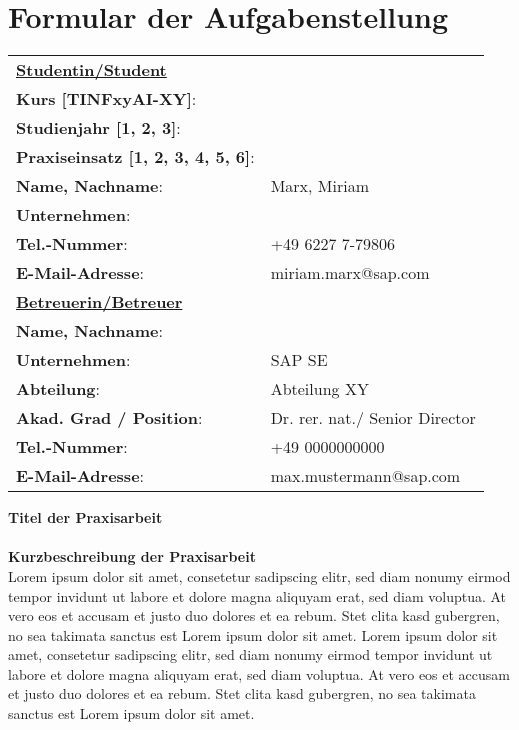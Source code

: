 \chapter*{Formular der Aufgabenstellung} %


\begin{spacing}{1.3}
\begin{tabular}{ll}
\underline{\textbf{Studentin/Student}}	& \\
\textbf{Kurs [TINFxyAI-XY]}: 			& \quad \kurs \\ 
\textbf{Studienjahr [1, 2, 3]}:			& \quad	3\\
\textbf{Praxiseinsatz [1, 2, 3, 4, 5, 6]}:	& \quad 5\\
\textbf{Name, Nachname}:				& \quad Marx, Miriam\\
\textbf{Unternehmen}:	 				& \quad \firma \\ 
\textbf{Tel.-Nummer}: 					& \quad  +49 6227 7-79806\\ 
\textbf{E-Mail-Adresse}: 				& \quad miriam.marx@sap.com  \\ [2ex]

\underline{\textbf{Betreuerin/Betreuer}}	& \\
\textbf{Name, Nachname}: 				& \quad \betreuerfirma \\ 
\textbf{Unternehmen}:					& \quad	SAP SE\\
\textbf{Abteilung}:						& \quad Abteilung XY\\
\textbf{Akad. Grad / Position}:			& \quad Dr. rer. nat./ Senior Director\\
\textbf{Tel.-Nummer}:	 				& \quad +49 0000000000 \\ 
\textbf{E-Mail-Adresse}: 				& \quad max.mustermann@sap.com  \\ [6ex]
\end{tabular} 
\end{spacing}


\textbf{Titel der Praxisarbeit}\\
\titel\\

\textbf{Kurzbeschreibung der Praxisarbeit}\\
Lorem ipsum dolor sit amet, consetetur sadipscing elitr, sed diam nonumy eirmod tempor invidunt ut labore et dolore magna aliquyam erat, sed diam voluptua. At vero eos et accusam et justo duo dolores et ea rebum. Stet clita kasd gubergren, no sea takimata sanctus est Lorem ipsum dolor sit amet. Lorem ipsum dolor sit amet, consetetur sadipscing elitr, sed diam nonumy eirmod tempor invidunt ut labore et dolore magna aliquyam erat, sed diam voluptua. At vero eos et accusam et justo duo dolores et ea rebum. Stet clita kasd gubergren, no sea takimata sanctus est Lorem ipsum dolor sit amet.\\


